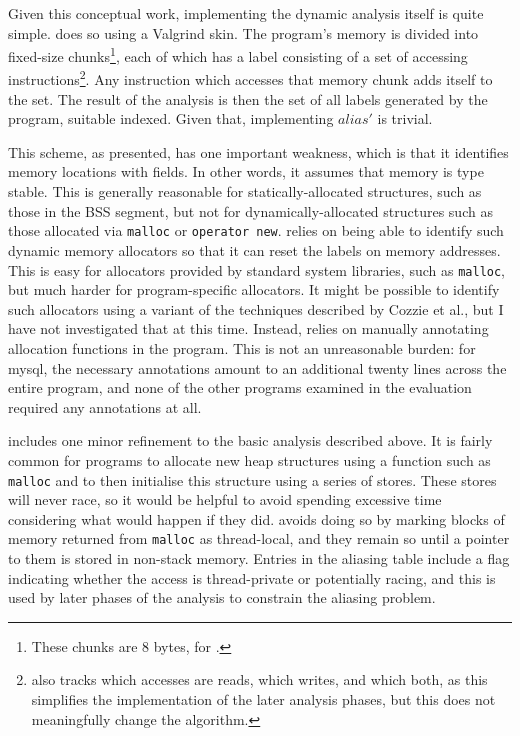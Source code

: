 {Given this conceptual work, implementing the dynamic analysis itself
is quite simple.  {\Implementation} does so using a Valgrind skin.
The program's memory is divided into fixed-size chunks\footnote{These
  chunks are 8 bytes, for {\implementation}.}, each of which has a
label consisting of a set of accessing
instructions\footnote{{\Implementation} also tracks which accesses are
  reads, which writes, and which both, as this simplifies the
  implementation of the later analysis phases, but this does not
  meaningfully change the algorithm.}.  Any instruction which accesses
that memory chunk adds itself to the set.  The result of the analysis
is then the set of all labels generated by the program, suitable
indexed.  Given that, implementing $\mathit{alias}'$ is trivial.

This scheme, as presented, has one important weakness, which is that
it identifies memory locations with fields.  In other words, it
assumes that memory is type stable\cite{Greenwald1996}.  This is
generally reasonable for statically-allocated structures, such as
those in the BSS segment\cite[Section~7.6]{Stevens}, but not for
dynamically-allocated structures such as those allocated via
\texttt{malloc} or \texttt{operator new}.  {\Implementation} relies on
being able to identify such dynamic memory allocators so that it can
reset the labels on memory addresses.  This is easy for allocators
provided by standard system libraries, such as \texttt{malloc}, but
much harder for program-specific allocators.  It might be possible to
identify such allocators using a variant of the techniques described
by Cozzie et al.\cite{Cozzie2008}, but I have not investigated that at
this time.  Instead, {\implementation} relies on manually annotating
allocation functions in the program.  This is not an unreasonable
burden: for mysql, the necessary annotations amount to an additional
twenty lines across the entire program, and none of the other programs
examined in the evaluation required any annotations at all.

{\Implementation} includes one minor refinement to the basic analysis
described above.  It is fairly common for programs to allocate new
heap structures using a function such as \texttt{malloc} and to then
initialise this structure using a series of stores.  These stores will
never race, so it would be helpful to avoid spending excessive time
considering what would happen if they did.  {\Technique} avoids doing
so by marking blocks of memory returned from \texttt{malloc} as
thread-local, and they remain so until a pointer to them is stored in
non-stack memory.  Entries in the aliasing table include a flag
indicating whether the access is thread-private or potentially racing,
and this is used by later phases of the analysis to constrain the
aliasing problem.

}
